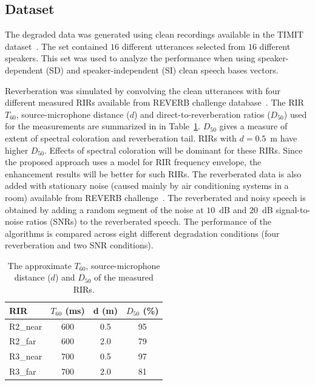\subsection{Dataset}
The degraded data was generated using clean recordings available in the TIMIT dataset~\cite{garofolo1993timit}. The set contained $16$ different utterances selected from $16$ different speakers. This set was used to analyze the performance when using speaker-dependent (SD) and speaker-independent (SI) clean speech bases vectors.

Reverberation was simulated by convolving the clean utterances with four different measured RIRs available from REVERB challenge database~\cite{kinoshita2016summary}. The RIR $T_{60}$, source-microphone distance ($d$) and direct-to-reverberation ratios
($D_{50}$) used for the measurements are summarized in in Table~\ref{tab:RIR_cond}. $D_{50}$ gives a measure of extent of spectral coloration and reverberation tail. RIRs with $d=0.5$~m have higher $D_{50}$. Effects of spectral coloration will be dominant for these RIRs. Since the proposed approach uses a model for RIR frequency envelope, the enhancement results will be better for such RIRs.
The reverberated data is also added with stationary noise (caused mainly by air conditioning systems in a room) available from REVERB challenge~\cite{kinoshita2016summary}. The reverberated and noisy speech is obtained by adding a random segment of the noise at $10$~dB and $20$~dB signal-to-noise ratios (SNRs) to the reverberated speech. 
The performance of the algorithms is compared across eight different degradation conditions (four reverberation and two SNR conditions).  

\begin{table}[ht]
\centering
\caption{The approximate $T_{60}$, source-microphone distance ($d$) and $D_{50}$ of the measured RIRs.}
\begin{tabular}{|l|c|c|c|}
\hline
\textbf{RIR} & \textbf{$T_{60}$ (ms)} & d\textbf{ (m)} & $D_{50}$\textbf{ (\%)} \\ \hline
R2\_near     & 600                    & 0.5            & 95                \\ \hline
R2\_far      & 600                    & 2.0            & 79                \\ \hline
R3\_near     & 700                    & 0.5            & 97                \\ \hline
R3\_far      & 700                    & 2.0            & 81                \\ \hline
\end{tabular}
\label{tab:RIR_cond}
\end{table}

